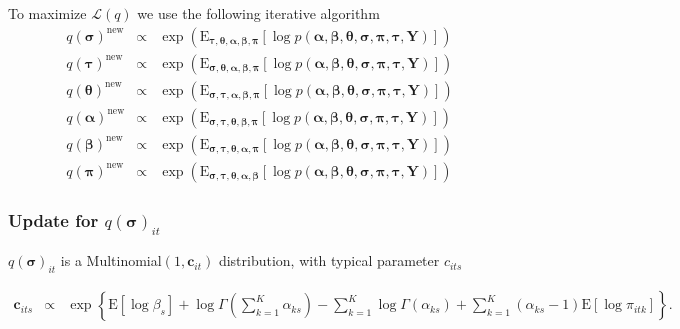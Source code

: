 \documentclass{beamer}
\numberwithin{equation}{section}
\begin{document}
\begin{frame}
To maximize $\mathcal{L}(q)$ we use the following iterative
algorithm \scriptsize
\begin{eqnarray}
q(\boldsymbol{\sigma})^{\text{new}} & \propto &
\exp\left(\text{E}_{\boldsymbol{\tau}, \boldsymbol{\theta},
\boldsymbol{\alpha}, \boldsymbol{\beta}, \boldsymbol{\pi} }[\log
p(\boldsymbol{\alpha}, \boldsymbol{\beta}, \boldsymbol{\theta},
\boldsymbol{\sigma}, \boldsymbol{\pi}, \boldsymbol{\tau},
\boldsymbol{Y}) ] \right) \nonumber \\
q(\boldsymbol{\tau})^{\text{new}} & \propto &
\exp\left(\text{E}_{\boldsymbol{\sigma}, \boldsymbol{\theta},
\boldsymbol{\alpha}, \boldsymbol{\beta}, \boldsymbol{\pi} }[\log
p(\boldsymbol{\alpha}, \boldsymbol{\beta}, \boldsymbol{\theta},
\boldsymbol{\sigma}, \boldsymbol{\pi}, \boldsymbol{\tau},
\boldsymbol{Y}) ] \right) \nonumber \\
q(\boldsymbol{\theta})^{\text{new}} & \propto &
\exp\left(\text{E}_{\boldsymbol{\sigma}, \boldsymbol{\tau},
\boldsymbol{\alpha}, \boldsymbol{\beta}, \boldsymbol{\pi} }[\log
p(\boldsymbol{\alpha}, \boldsymbol{\beta}, \boldsymbol{\theta},
\boldsymbol{\sigma}, \boldsymbol{\pi}, \boldsymbol{\tau},
\boldsymbol{Y}) ] \right) \nonumber \\
q(\boldsymbol{\alpha})^{\text{new}} & \propto &
\exp\left(\text{E}_{\boldsymbol{\sigma}, \boldsymbol{\tau},
\boldsymbol{\theta}, \boldsymbol{\beta}, \boldsymbol{\pi} }[\log
p(\boldsymbol{\alpha}, \boldsymbol{\beta}, \boldsymbol{\theta},
\boldsymbol{\sigma}, \boldsymbol{\pi}, \boldsymbol{\tau},
\boldsymbol{Y}) ] \right) \nonumber \\
q(\boldsymbol{\beta})^{\text{new}} & \propto &
\exp\left(\text{E}_{\boldsymbol{\sigma}, \boldsymbol{\tau},
\boldsymbol{\theta}, \boldsymbol{\alpha}, \boldsymbol{\pi} }[\log
p(\boldsymbol{\alpha}, \boldsymbol{\beta}, \boldsymbol{\theta},
\boldsymbol{\sigma}, \boldsymbol{\pi}, \boldsymbol{\tau},
\boldsymbol{Y}) ] \right) \nonumber \\
q(\boldsymbol{\pi})^{\text{new}} & \propto &
\exp\left(\text{E}_{\boldsymbol{\sigma}, \boldsymbol{\tau},
\boldsymbol{\theta}, \boldsymbol{\alpha}, \boldsymbol{\beta} }[\log
p(\boldsymbol{\alpha}, \boldsymbol{\beta}, \boldsymbol{\theta},
\boldsymbol{\sigma}, \boldsymbol{\pi}, \boldsymbol{\tau},
\boldsymbol{Y}) ] \right) \nonumber
\end{eqnarray}
\end{frame}

\begin{frame}
\frametitle{Update for $q(\boldsymbol{\sigma})_{it}$}
$q(\boldsymbol{\sigma})_{it}$ is a Multinomial$(1,
\boldsymbol{c}_{it})$ distribution, with typical parameter $c_{its}$

\scriptsize

\begin{eqnarray}
\boldsymbol{c}_{its} & \propto & \exp\left\{ \text{E}[\log \beta_s]
+ \log \Gamma (\sum_{k=1}^{K} \alpha_{ks} ) - \sum_{k=1}^{K} \log
\Gamma (\alpha_{ks})  +
            \sum_{k=1}^{K} (\alpha_{ks} - 1 )\text{E}[\log \pi_{itk}]    \right\}. \nonumber
\end{eqnarray}
\end{frame}
\end{document}
